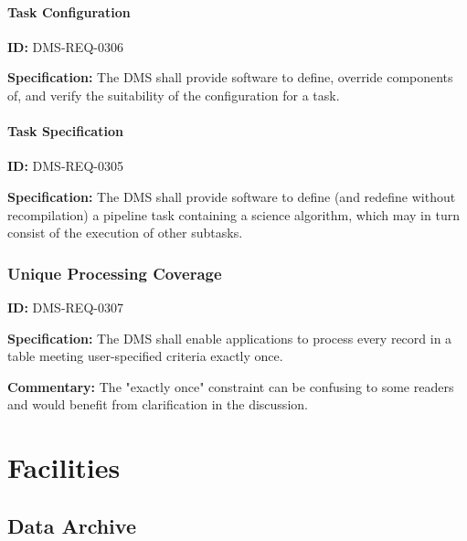 \documentclass[SE,toc,lsstdraft]{lsstdoc}
\begin{document}
\paragraph{Task Configuration}\hfill  %

\label{DMS-REQ-0306}
\textbf{ID:} DMS-REQ-0306

\textbf{Specification:} The DMS shall provide software to define, override components of, and verify the suitability of the configuration for a task.






\paragraph{Task Specification}\hfill  %

\label{DMS-REQ-0305}
\textbf{ID:} DMS-REQ-0305

\textbf{Specification:} The DMS shall provide software to define (and redefine without recompilation) a pipeline task containing a science algorithm, which may in turn consist of the execution of other subtasks.






\subsubsection{Unique Processing Coverage}

\label{DMS-REQ-0307}
\textbf{ID:} DMS-REQ-0307

\textbf{Specification:} The DMS shall enable applications to process every record in a table meeting user-specified criteria exactly once.

\textbf{Commentary: }The "exactly once" constraint can be confusing to some readers and would benefit from clarification in the discussion.






\section{Facilities}





\subsection{Data Archive}
\end{document}
